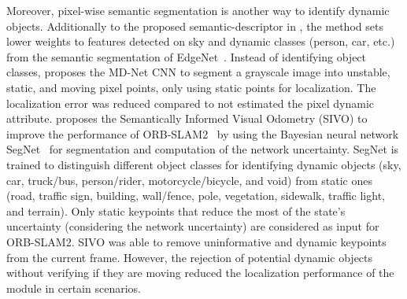 Moreover, pixel-wise semantic segmentation is another way to identify dynamic objects.
Additionally to the proposed semantic-descriptor in \cite{singh-et-al:2021:9564866}, the method sets lower weights to features detected on sky and dynamic classes (person, car, etc.) from the semantic segmentation of EdgeNet~\parencite{original:edgenet}.
Instead of identifying object classes, \cite{song-et-al:2019:8967749} proposes the MD-Net CNN to segment a grayscale image into unstable, static, and moving pixel points, only using static points for localization. The localization error was reduced compared to not estimated the pixel dynamic attribute.
\cite{ganti-waslander:2019:00024} proposes the Semantically Informed Visual Odometry (SIVO) to improve the performance of ORB-SLAM2~\parencite{discussion:orb-slam2} by using the Bayesian neural network SegNet~\parencite{original:bayesian-segnet} for segmentation and computation of the network uncertainty. SegNet is trained to distinguish different object classes for identifying dynamic objects (sky, car, truck/bus, person/rider, motorcycle/bicycle, and void) from static ones (road, traffic sign, building, wall/fence, pole, vegetation, sidewalk, traffic light, and terrain). Only static keypoints that reduce the most of the state's uncertainty (considering the network uncertainty) are considered as input for ORB-SLAM2.
SIVO was able to remove uninformative and dynamic keypoints from the current frame. However, the rejection of potential dynamic objects without verifying if they are moving reduced the localization performance of the module in certain scenarios.

